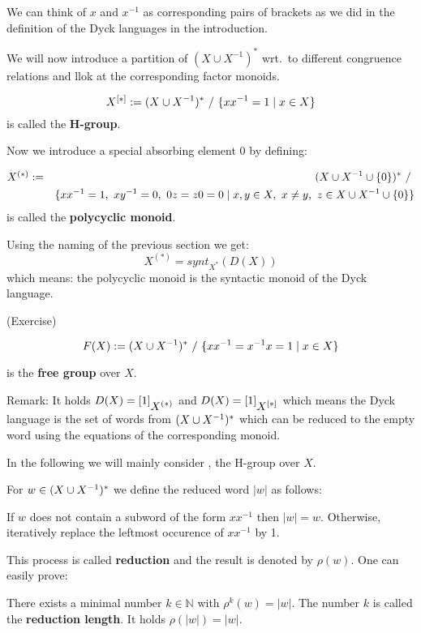 We can think of $x$ and $x^{-1}$ as corresponding pairs of
brackets as we did in the definition of the Dyck languages in the introduction.

We will now introduce a partition of $(X \cup X^{-1})^*$ wrt.\ to
different congruence relations and llok at the corresponding factor monoids.

\begin{definition}
\[ \mbox{${X}^{[*]}$} := (X \cup {X}^{-1})^*\ /\ \{ x x^{-1} = 1 \mid x \in X \} \] is
called the {\bf H-group}.
\end{definition}

Now we introduce a special absorbing element $0$ by defining:
\begin{definition}
\begin{eqnarray*}
\mbox{${X}^{(*)}$} & := & (X \cup {X}^{-1} \cup \{ 0 \})^*\ /\ \\
& & \{ x x^{-1} = 1,\ x y^{-1} = 0,\ 0
z = z 0 = 0 \mid x,y \in X,\ x\neq y,\ z \in X \cup {X}^{-1} \cup \{0\} \}
\end{eqnarray*}
is called the {\bf polycyclic monoid}.
\end{definition}

Using the naming of the previous section we get:
\[ X^{(*)} = synt_{X^*}(D(X)) \]
which means: the polycyclic monoid is the syntactic monoid of the Dyck language.

(Exercise)

\begin{definition}
\[ F(X) := (X \cup {X}^{-1})^*\ /\ \{ x x^{-1} = x^{-1} x = 1 \mid x \in X \} \]
\end{definition}
is the {\bf free group} over $X$.

Remark: It holds $D(X) = [1]_{\mbox{${X}^{(*)}$}}$ and $D(X) = [1]_{\mbox{${X}^{[*]}$}}$ which
means the Dyck language is the set of words from $(X \cup {X}^{-1})^*$ which can be
reduced to the empty word using the equations of the corresponding monoid.

In the following we will mainly consider , the H-group over $X$.

For $w \in (X \cup {X}^{-1})^*$ we define the reduced word $|w|$ as follows: 

If $w$ does not contain a subword of the form $x x^{-1}$ then $|w| = w$.
Otherwise, iteratively replace the leftmost occurence of $x x^{-1}$ by 1.

This process is called {\bf reduction} and the result is denoted by $\rho(w)$.
One can easily prove:

\begin{lemma}
There exists a minimal number $k \in \mathbb{N}$ with $\rho^k(w) = |w|$. The
number $k$ is called the {\bf reduction length}. It holds $\rho(|w|) = |w|$.
\end{lemma}

